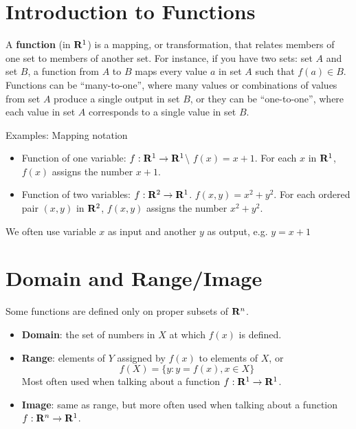 \documentclass[]{book}
\providecommand{\tightlist}{%
  \setlength{\itemsep}{0pt}\setlength{\parskip}{0pt}}
\theoremstyle{definition}
\theoremstyle{definition}
\theoremstyle{definition}
\theoremstyle{remark}
\begin{document}
\section{Introduction to Functions}\label{introduction-to-functions}

A \textbf{function} (in \({\bf R}^1\)) is a mapping, or transformation,
that relates members of one set to members of another set. For instance,
if you have two sets: set \(A\) and set \(B\), a function from \(A\) to
\(B\) maps every value \(a\) in set \(A\) such that \(f(a) \in B\).
Functions can be ``many-to-one'', where many values or combinations of
values from set \(A\) produce a single output in set \(B\), or they can
be ``one-to-one'', where each value in set \(A\) corresponds to a single
value in set \(B\).

Examples: Mapping notation

\begin{itemize}
\tightlist
\item
  Function of one variable: \(f:{\bf R}^1\to{\bf R}^1\)\textbackslash{}
  \(f(x)=x+1\). For each \(x\) in \({\bf R}^1\), \(f(x)\) assigns the
  number \(x+1\).
\item
  Function of two variables: \(f: {\bf R}^2\to{\bf R}^1\).
  \(f(x,y)=x^2+y^2\). For each ordered pair \((x,y)\) in \({\bf R}^2\),
  \(f(x,y)\) assigns the number \(x^2+y^2\).
\end{itemize}

We often use variable \(x\) as input and another \(y\) as output, e.g.
\(y=x+1\)

\section{Domain and Range/Image}\label{domain-and-rangeimage}

Some functions are defined only on proper subsets of \({\bf R}^n\).

\begin{itemize}
\tightlist
\item
  \textbf{Domain}: the set of numbers in \(X\) at which \(f(x)\) is
  defined.
\item
  \textbf{Range}: elements of \(Y\) assigned by \(f(x)\) to elements of
  \(X\), or \[f(X)=\{ y : y=f(x), x\in X\}\] Most often used when
  talking about a function \(f:{\bf R}^1\to{\bf R}^1\).
\item
  \textbf{Image}: same as range, but more often used when talking about
  a function \(f:{\bf R}^n\to{\bf R}^1\).
\end{itemize}
\end{document}
